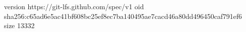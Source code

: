 version https://git-lfs.github.com/spec/v1
oid sha256:c65ad6e5ac41bf608bc25ef8ec7ba140495ae7cacd46a80dd496450caf791ef6
size 13332
